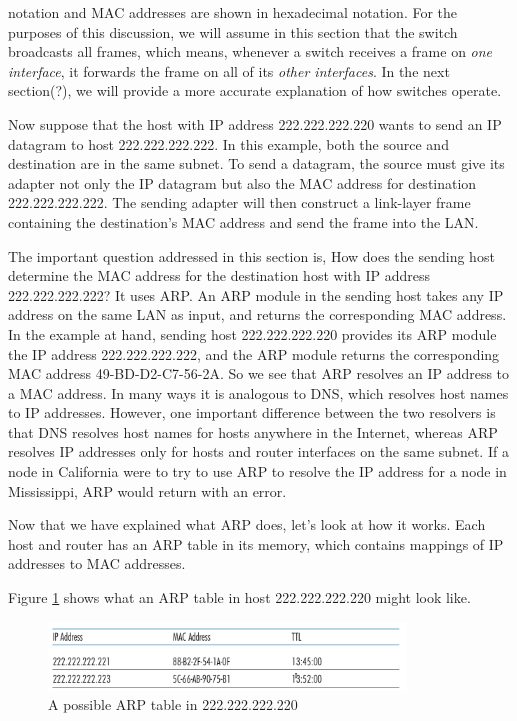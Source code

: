 \documentclass[a4paper,12pt]{book}
\begin{document}
notation and MAC addresses are shown in hexadecimal notation. For the purposes of this discussion, we will assume in this section that the switch broadcasts all frames, which means, whenever a switch receives a frame on \emph{one interface}, it forwards the frame on all of its \emph{other interfaces}. In the next section(?), we will provide a more accurate explanation of how switches operate.

Now suppose that the host with IP address 222.222.222.220 wants to send an IP datagram to host 222.222.222.222. In this example, both the source and destination are in the same subnet. To send a datagram, the source must give its adapter not only the IP datagram but also the MAC address for destination 222.222.222.222. The sending adapter will then construct a link-layer frame containing the destination’s MAC address and send the frame into the LAN.

The important question addressed in this section is, How does the sending host determine the MAC address for the destination host with IP address 222.222.222.222? It uses ARP. An ARP module in the sending host takes any IP address on the same LAN as input, and returns the corresponding MAC address. In the example at hand, sending host 222.222.222.220 provides its ARP module the IP address 222.222.222.222, and the ARP module returns the corresponding MAC address 49-BD-D2-C7-56-2A. So we see that ARP resolves an IP address to a MAC address. In many ways it is analogous to DNS, which resolves host names to IP addresses. However, one important difference between the two resolvers is that DNS resolves host names for hosts anywhere in the Internet, whereas ARP resolves IP addresses only for hosts and router interfaces on the same subnet. If a node in California were to try to use ARP to resolve the IP address for a node in Mississippi, ARP would return with an error.

Now that we have explained what ARP does, let’s look at how it works. Each host and router has an ARP table in its memory, which contains mappings of IP addresses to MAC addresses.

Figure \ref{fig:ARP-table} shows what an ARP table in host 222.222.222.220 might look like.

\begin{figure}
\centering
\includegraphics[width=9.5cm]{./ARP-table.PNG}
\caption{A possible ARP table in 222.222.222.220}\label{fig:ARP-table}
\end{figure}
\end{document}
